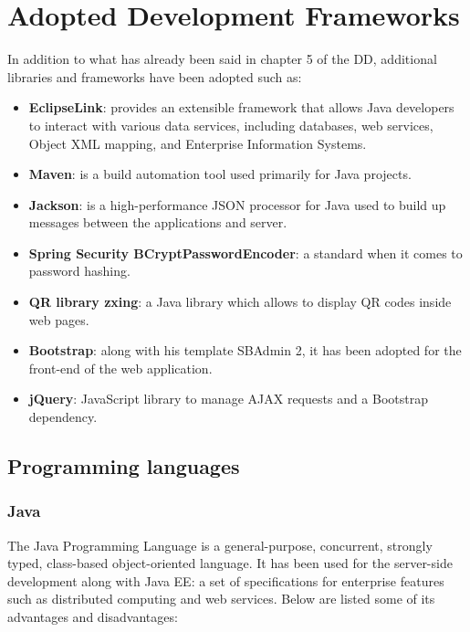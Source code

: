 \chapter{Adopted Development Frameworks}
In addition to what has already been said in chapter 5 of the DD, additional libraries and frameworks have been adopted such as:
\begin{itemize}
	\item \textbf{EclipseLink}: provides an extensible framework that allows Java developers to interact with various data services, including databases, web services, Object XML mapping, and Enterprise Information Systems.
	
	\item \textbf{Maven}: is a build automation tool used primarily for Java projects.
	
	\item \textbf{Jackson}: is a high-performance JSON processor for Java used to build up messages between the applications and server.
	
	\item \textbf{Spring Security BCryptPasswordEncoder}: a standard when it comes to password hashing.
	
	\item \textbf{QR library zxing}: a Java library which allows to display QR codes inside web pages.
	
	\item \textbf{Bootstrap}: along with his template SBAdmin 2, it has been adopted for the front-end of the web application.
	
	\item \textbf{jQuery}: JavaScript library to manage AJAX requests and a Bootstrap dependency.
\end{itemize}

\section{Programming languages}

\subsection{Java}
 The Java Programming Language is a general-purpose, concurrent, strongly typed, class-based object-oriented language. It has been used for the server-side development along with Java EE: a set of specifications for enterprise features such as distributed computing and web services. Below are listed some of its advantages and disadvantages:
 
